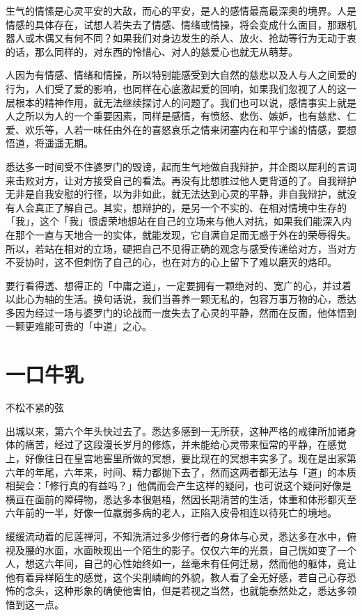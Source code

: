 \documentclass[12pt,twoside,openany]{book}
\begin{document}
生气的情愫是心灵平安的大敌，而心的平安，是人的感情最高最深奥的境界。人是情感的具体存在，试想人若失去了情感、情绪或情操，将会变成什么面目，那跟机器人或木偶又有何不同？如果我们对身边发生的杀人、放火、抢劫等行为无动于衷的话，那么同样的，对东西的怜惜心、对人的慈爱心也就无从萌芽。

人因为有情感、情绪和情操，所以特别能感受到大自然的慈悲以及人与人之间爱的行为，人们受了爱的影响，也同样在心底激起爱的回响，如果我们忽视了人的这一层根本的精神作用，就无法继续探讨人的问题了。我们也可以说，感情事实上就是人之所以为人的一个重要因素，同样是感情，有愤怒、悲伤、嫉妒，也有慈悲、仁爱、欢乐等，人若一味任由外在的喜怒哀乐之情来闭塞内在和平宁谧的情感，要想悟道，将遥遥无期。

悉达多一时间受不住婆罗门的毁谤，起而生气地做自我辩护，并企图以犀利的言词来击败对方，让对方接受自己的看法。再没有比想胜过他人更背道的了。自我辩护无非是自我安慰的行径，以为非如此，就无法达到心灵的平静，非自我辩护，就没有人会真正了解自己。其实，想辩护的，是另一个不实的、在相对情境中生存的「我」，这个「我」很虚荣地想站在自己的立场来与他人对抗，如果我们能深入内在那个一直与天地合一的实体，就能发现，它自满自足而无惑于外在的荣辱得失。所以，若站在相对的立场，硬把自己不见得正确的观念与感受传递给对方，当对方不妥协时，这不但刺伤了自己的心，也在对方的心上留下了难以磨灭的烙印。

要行看得透、想得正的「中庸之道」，一定要拥有一颗绝对的、宽广的心，并过着以此心为轴的生活。换句话说，我们当善养一颗无私的，包容万事万物的心，悉达多因为经过一场与婆罗门的论战而一度失去了心灵的平静，然而在反面，他体悟到一颗更难能可贵的「中道」之心。

\section{一口牛乳}\label{sec1.9}

不松不紧的弦

出城以来，第六个年头快过去了。悉达多感到一无所获，这种严格的戒律所加诸身体的痛苦，经过了这段漫长岁月的修炼，并未能给心灵带来恒常的平静，在感觉上，好像往日在皇宫地窖里所做的冥想，要比现在的冥想丰实多了。现在是出家第六年的年尾，六年来，时间、精力都抛下去了，然而这两者都无法与「道」的本质相契会：「修行真的有益吗？」他偶而会产生这样的疑问，也可说这个疑问好像是横亘在面前的障碍物，悉达多本很魁梧，然因长期清苦的生活，体重和体形都灭至六年前的一半，好像一位羸弱多病的老人，正陷入皮骨相连以待死亡的境地。

缓缓流动着的尼莲禅河，不知洗清过多少修行者的身体与心灵，悉达多在水中，俯视及腰的水面，水面映现出一个陌生的影子。仅仅六年的光景，自己恍如变了一个人，想这六年间，自己的心性始终如一，丝毫未有任何迁易，然而他的躯体，竟让他有着异样陌生的感觉，这个尖削嶙峋的外貌，教人看了全无好感，若自己心存恐怖的念头，这种形象的确使他害怕，但是若视之当然，也就能泰然处之，悉达多领悟到这一点。
\end{document}
